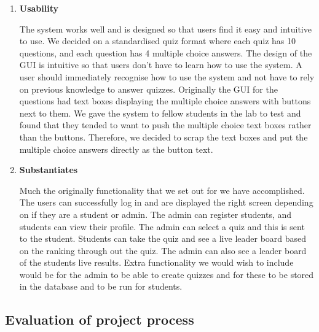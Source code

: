 \begin{enumerate}
	\item \textbf{Usability}

		The system works well and is designed so that users find it easy and
		intuitive to use. We decided on a standardised quiz format where each
		quiz has 10 questions, and each question has 4 multiple choice answers.
		The design of the GUI is intuitive so that users don't have to learn
		how to use the system. A user should immediately recognise how to use
		the system and not have to rely on previous knowledge to answer
		quizzes. Originally the GUI for the questions had text boxes displaying
		the multiple choice answers with buttons next to them. We gave the
		system to fellow students in the lab to test and found that they tended
		to want to push the multiple choice text boxes rather than the buttons.
		Therefore, we decided to scrap the text boxes and put the multiple
		choice answers directly as the button text.

	\item \textbf{Substantiates}

		Much the originally functionality that we set out for we have
		accomplished.  The users can successfully log in and are displayed the
		right screen depending on if they are a student or admin. The admin can
		register students, and students can view their profile. The admin can
		select a quiz and this is sent to the student. Students can take the
		quiz and see a live leader board based on the ranking through out the
		quiz. The admin can also see a leader board of the students live
		results. Extra functionality we would wish to include would be for the
		admin to be able to create quizzes and for these to be stored in the
		database and to be run for students.

\end{enumerate}

\subsection{Evaluation of project process}
\label{sub:evaluation_of_project_process}

